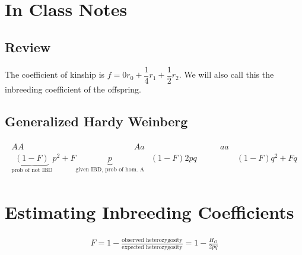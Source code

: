 \documentclass{article}
\begin{document}
    \section{In Class Notes}
        \subsection{Review}
            The coefficient of kinship is $f = 0r_0 + \dfrac{1}{4}r_1 + \dfrac{1}{2}r_2$.  We will also call this the inbreeding coefficient of the offspring.

        \subsection{Generalized Hardy Weinberg}
            \begin{align}
                \begin{array}{ccc}
                    AA & Aa & aa \\
                    \underbrace{(1 - F)}_{\text{prob of not IBD}}p^2 + F\underbrace{p}_{\text{given IBD, prob of hom. A}} \qquad&\qquad (1 - F)2pq \qquad&\qquad (1 - F)q^2 + Fq
                \end{array}
            \end{align}

        \section{Estimating Inbreeding Coefficients}
            \begin{align}
                \hat{F} = 1 - \frac{\text{observed heterozygosity}}{\text{expected heterozygosity}} = 1 - \frac{H_O}{2pq}
            \end{align}
\end{document}
